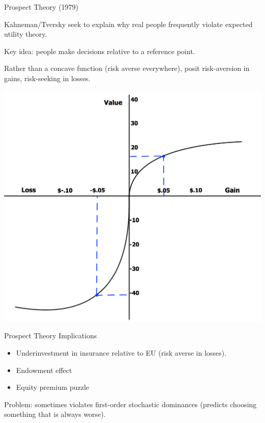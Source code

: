 \documentclass[ignorenonframetext,]{beamer}
\providecommand{\tightlist}{%
  \setlength{\itemsep}{0pt}\setlength{\parskip}{0pt}}
\begin{document}
\begin{frame}{Prospect Theory (1979)}
\protect\hypertarget{prospect-theory-1979}{}

Kahneman/Tversky seek to explain why real people frequently violate
expected utility theory.

Key idea: people make decisions relative to a reference point.

Rather than a concave function (risk averse everywhere), posit
risk-aversion in gains, risk-seeking in losses.

\includegraphics[width=1\textwidth,height=\textheight]{cpt.png}

\end{frame}

\begin{frame}{Prospect Theory Implications}
\protect\hypertarget{prospect-theory-implications}{}

\begin{itemize}
\tightlist
\item
  Underinvestment in insurance relative to EU (risk averse in losses).
\item
  Endowment effect
\item
  Equity premium puzzle
\end{itemize}

Problem: sometimes violates first-order stochastic dominances (predicts
choosing something that is always worse).

\end{frame}
\end{document}
